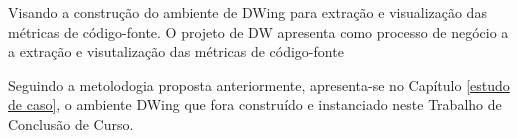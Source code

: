 Visando a construção do ambiente de DWing para extração e visualização das métricas de código-fonte. O projeto de DW apresenta como processo de negócio a a extração e visutalização das métricas de código-fonte

Seguindo a metolodogia proposta anteriormente, apresenta-se no Capítulo \ref{estudo de caso}, o ambiente DWing que fora construído e instanciado neste Trabalho de Conclusão de Curso. 
